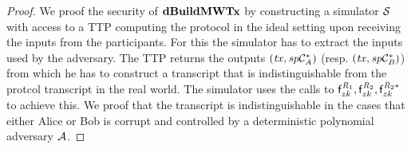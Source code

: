 \begin{proof}
    We proof the security of $\mathbf{dBuildMWTx}$ by constructing a simulator $\mathcal{S}$ with access to a TTP computing the protocol in the ideal setting upon receiving the inputs from the participants.
    For this the simulator has to extract the inputs used by the adversary.
    The TTP returns the outputs $(\mathit{tx}, \mathit{sp}\mathcal{C}_{\mathit{A}}^*)$ (resp. $(\mathit{tx}, \mathit{sp}\mathcal{C}_{\mathit{B}}^*)$) from which he has to construct a transcript that is indistinguishable from the protcol transcript in the real world. The simulator uses the calls to $\mathsf{f}^{\mathit{R}_1}_{zk}, \mathsf{f}^{\mathit{R}_2}_{zk}, \mathsf{f}^{\mathit{R}_2*}_{zk}$ to achieve this.
    We proof that the transcript is indistinguishable in the cases that either Alice or Bob is corrupt and controlled by a deterministic polynomial adversary $\mathcal{A}$.


\end{proof}
